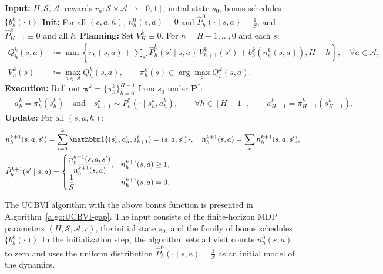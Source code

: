 \documentclass[11pt]{article}
\newcommand{\pii}{\boldsymbol{\pi}}
\newcommand{\pp}{\boldsymbol{P}}
\begin{document}
\begin{algorithm}[ht]
\caption{Optimistic Value Iteration}
\label{algo:UCBVI-gap}
\begin{algorithmic}[1]
    \STATE \textbf{Input:} $H,\mathcal S,\mathcal A$, rewards $r_h:\mathcal{S}\times\mathcal{A}\to[0,1]$, initial state $s_0$, bonus schedules $\{b^k_h(\cdot)\}$.
\STATE \textbf{Init:} For all $(s,a,h)$, $n_h^0(s,a)=0$ and $\hat P_h^0(\cdot\mid s,a)=\tfrac1S$, and $\hat P_{H-1}^k\equiv 0$ and all $k$.
\STATE \textbf{Planning:} Set $V_H^k\equiv 0$. For $h=H-1,\dots,0$ and each $s$:
\begin{align*}
Q_h^k(s,a)&\coloneqq\min\left\{r_h(s,a)+\sum_{s'}\hat P_h^k(s'\mid s,a)\,V_{h+1}^k(s')+b_h^k(n_h^k(s,a)),H-h\right\},
\quad \forall a\in\mathcal A,\\
V_h^k(s)&\coloneqq\max_{a\in\mathcal A}Q_h^k(s,a),\qquad
\pi_h^k(s)\in\arg\max_{a}Q_h^k(s,a).
\end{align*}
\STATE \textbf{Execution:} Roll out $\pii^k=\{\pi_h^k\}_{h=0}^{H-1}$ from $s_0$ under $\pp^*$:
\begin{align*}
  &a_h^k=\pi_h^k(s_h^k)\quad \text{and} \quad s_{h+1}^k\sim P_h^*(\cdot\mid s_h^k,a_h^k),\qquad \forall h\in[H-1] , \qquad a_{H-1}^k=\pi_{H-1}^k(s_{H-1}^k).
\end{align*}
\STATE \textbf{Update:} For all $(s,a,h)$:
\begin{align*}
&n_h^{k+1}(s,a,s')=\sum_{i=0}^{k}\mathbbm 1\{(s_h^i,a_h^i,s_{h+1}^i)=(s,a,s')\},\quad
n_h^{k+1}(s,a)=\sum_{s'}n_h^{k+1}(s,a,s'),\\
&\hat P_h^{k+1}(s'\mid s,a)=
\begin{cases}
\dfrac{n_h^{k+1}(s,a,s')}{n_h^{k+1}(s,a)}, & n_h^{k+1}(s,a)\ge1,\\[1ex]
\dfrac1S, & n_h^{k+1}(s,a)=0.
\end{cases}
\end{align*}
\ENDFOR
\end{algorithmic}
\end{algorithm}

The UCBVI algorithm with the above bonus function is presented in Algorithm~\ref{algo:UCBVI-gap}. The input consists of the finite-horizon MDP parameters $(H,\mathcal S,\mathcal A,r)$, the initial state $s_0$, and the family of bonus schedules $\{b_h^k(\cdot)\}$. In the initialization step, the algorithm sets all visit counts $n_h^0(s,a)$ to zero and uses the uniform distribution $\hat P_h^0(\cdot\mid s,a)=\tfrac1S$ as an initial model of the dynamics.
\end{document}
